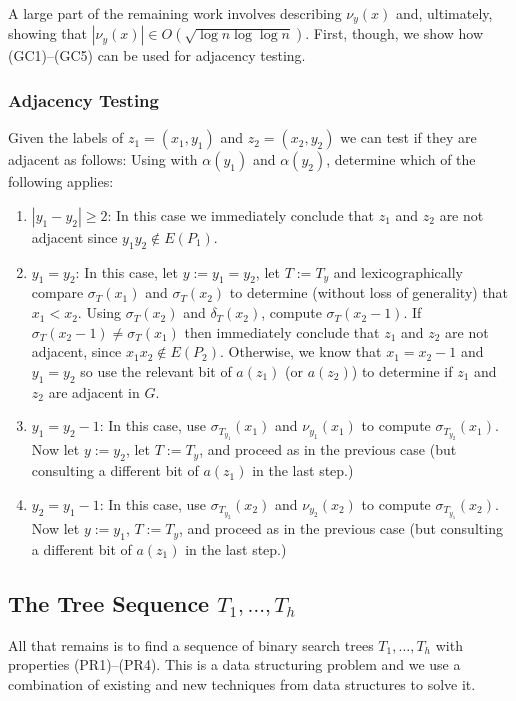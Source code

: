 \documentclass[kpfonts]{patmorin}
\begin{document}
A large part of the remaining work involves describing $\nu_y(x)$ and, ultimately, showing that $|\nu_y(x)|\in O(\sqrt{\log n\log\log n})$. First, though, we show how (GC1)--(GC5) can be used for adjacency testing.

\subsubsection{Adjacency Testing}

Given the labels of $z_1=(x_1,y_1)$ and $z_2=(x_2,y_2)$ we can test if they are adjacent as follows: Using  with $\alpha(y_1)$ and $\alpha(y_2)$, determine which of the following applies:
\begin{enumerate}
  \item $|y_1-y_2|\ge 2$: In this case we immediately conclude that $z_1$ and $z_2$ are not adjacent since $y_1y_2\not\in E(P_1)$.  
  
  \item $y_1=y_2$: In this case, let $y:=y_1=y_2$, let $T:=T_y$ and lexicographically compare $\sigma_T(x_1)$ and $\sigma_T(x_2)$ to determine (without loss of generality) that $x_1<x_2$.  Using $\sigma_{T}(x_2)$ and $\delta_{T}(x_2)$, compute $\sigma_T(x_2-1)$.  If $\sigma_T(x_2-1)\neq \sigma_T(x_1)$ then immediately conclude that $z_1$ and $z_2$ are not adjacent, since $x_1x_2\not\in E(P_2)$.  Otherwise, we know that $x_1=x_2-1$ and $y_1=y_2$ so use the relevant bit of $a(z_1)$ (or $a(z_2)$) to determine if $z_1$ and $z_2$ are adjacent in $G$.
  
  \item $y_1=y_2-1$: In this case, use $\sigma_{T_{y_1}}(x_1)$ and $\nu_{y_1}(x_1)$ to compute $\sigma_{T_{y_2}}(x_1)$.  Now let $y:=y_2$, let $T:=T_{y}$, and proceed as in the previous case (but consulting a different bit of $a(z_1)$ in the last step.)
  
  \item $y_2=y_1-1$: In this case, use $\sigma_{T_{y_2}}(x_2)$ and $\nu_{y_2}(x_2)$ to compute $\sigma_{T_{y_1}}(x_2)$.  Now let $y:=y_1$, $T:=T_{y}$, and proceed as in the previous case (but consulting a different bit of $a(z_1)$ in the last step.)
\end{enumerate}


\subsection{The Tree Sequence $T_1,\ldots,T_h$}

All that remains is to find a sequence of binary search trees $T_1,\ldots,T_h$ with properties (PR1)--(PR4). This is a data structuring problem and we use a combination of existing and new techniques from data structures to solve it.
\end{document}
